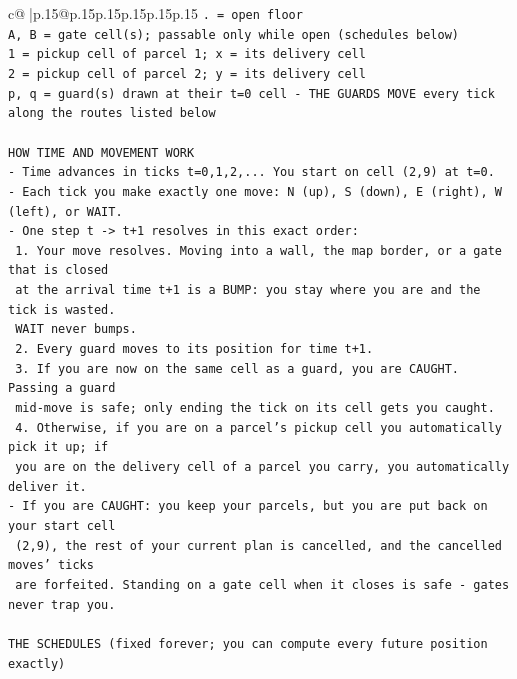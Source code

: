 \documentclass{article}
\begin{document}
{\begin{supertabular}{c@{$\;$}|p{.15\linewidth}@{}p{.15\linewidth}p{.15\linewidth}p{.15\linewidth}p{.15\linewidth}p{.15\linewidth}}
{{{\texttt{. = open floor} \\
\texttt{A, B = gate cell(s); passable only while open (schedules below)} \\
\texttt{1 = pickup cell of parcel 1; x = its delivery cell} \\
\texttt{2 = pickup cell of parcel 2; y = its delivery cell} \\
\texttt{p, q = guard(s) drawn at their t=0 cell {-} THE GUARDS MOVE every tick along the routes listed below} \\
\\ 
\texttt{HOW TIME AND MOVEMENT WORK} \\
\texttt{{-} Time advances in ticks t=0,1,2,... You start on cell (2,9) at t=0.} \\
\texttt{{-} Each tick you make exactly one move: N (up), S (down), E (right), W (left), or WAIT.} \\
\texttt{{-} One step t {-}> t+1 resolves in this exact order:} \\
\texttt{  1. Your move resolves. Moving into a wall, the map border, or a gate that is closed} \\
\texttt{     at the arrival time t+1 is a BUMP: you stay where you are and the tick is wasted.} \\
\texttt{     WAIT never bumps.} \\
\texttt{  2. Every guard moves to its position for time t+1.} \\
\texttt{  3. If you are now on the same cell as a guard, you are CAUGHT. Passing a guard} \\
\texttt{     mid{-}move is safe; only ending the tick on its cell gets you caught.} \\
\texttt{  4. Otherwise, if you are on a parcel's pickup cell you automatically pick it up; if} \\
\texttt{     you are on the delivery cell of a parcel you carry, you automatically deliver it.} \\
\texttt{{-} If you are CAUGHT: you keep your parcels, but you are put back on your start cell} \\
\texttt{  (2,9), the rest of your current plan is cancelled, and the cancelled moves' ticks} \\
\texttt{  are forfeited. Standing on a gate cell when it closes is safe {-} gates never trap you.} \\
\\ 
\texttt{THE SCHEDULES (fixed forever; you can compute every future position exactly)} \\
}}}
\end{supertabular}}
\end{document}
